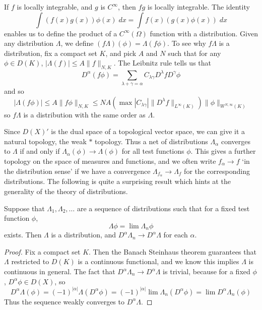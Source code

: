 If $f$ is locally integrable, and $g$ is $C^\infty$, then $fg$ is locally integrable. The identity
%
\[ \int (f(x)g(x)) \phi(x)\; dx = \int f(x) (g(x) \phi(x))\; dx \]
%
enables us to define the product of a $C^\infty(\Omega)$ function with a distribution. Given any distribution $\Lambda$, we define $(f \Lambda)(\phi) = \Lambda(f \phi)$. To see why $f \Lambda$ is a distribution, fix a compact set $K$, and pick $A$ and $N$ such that for any $\phi \in D(K)$, $|\Lambda(f)| \leq A \| f \|_{N,K}$. The Leibnitz rule tells us that
%
\[ D^\alpha(f \phi) = \sum_{\lambda + \gamma = \alpha} C_{\lambda \gamma} D^\lambda f D^\gamma \phi \]
%
and so
%
\[ |\Lambda(f \phi)| \leq A \| f \phi \|_{N,K} \leq N A \left( \max |C_{\lambda \gamma}| \| D^\lambda f \|_{L^\infty(K)} \right) \| \phi \|_{W^{N,\infty}(K)} \]
%
so $f \Lambda$ is a distribution with the same order as $\Lambda$.

Since $D(X)'$ is the dual space of a topological vector space, we can give it a natural topology, the weak $*$ topology. Thus a net of distributions $\Lambda_\alpha$ converges to $\Lambda$ if and only if $\Lambda_\alpha(\phi) \to \Lambda(\phi)$ for all test functions $\phi$. This gives a further topology on the space of measures and functions, and we often write $f_\alpha \to f$ `in the distribution sense' if we have a convergence $\Lambda_{f_\alpha} \to \Lambda_f$ for the corresponding distributions. The following is quite a surprising result which hints at the generality of the theory of distributions.

\begin{theorem}
    Suppose that $\Lambda_1, \Lambda_2, \dots$ are a sequence of distributions such that for a fixed test function $\phi$,
    \[ \Lambda \phi = \lim \Lambda_n \phi \]
    exists. Then $\Lambda$ is a distribution, and $D^\alpha \Lambda_n \to D^\alpha \Lambda$ for each $\alpha$.
\end{theorem}
\begin{proof}
    Fix a compact set $K$. Then the Banach Steinhaus theorem guarantees that $\Lambda$ restricted to $D(K)$ is a continuous functional, and we know this implies $\Lambda$ is continuous in general. The fact that $D^\alpha \Lambda_n \to D^\alpha \Lambda$ is trivial, because for a fixed $\phi$, $D^\alpha \phi \in D(X)$, so
    \[ D^\alpha \Lambda(\phi) = (-1)^{|\alpha|} \Lambda(D^\alpha \phi) = (-1)^{|\alpha|} \lim \Lambda_n(D^\alpha \phi) = \lim D^\alpha \Lambda_n(\phi) \]
    Thus the sequence weakly converges to $D^\alpha \Lambda$.
\end{proof}

